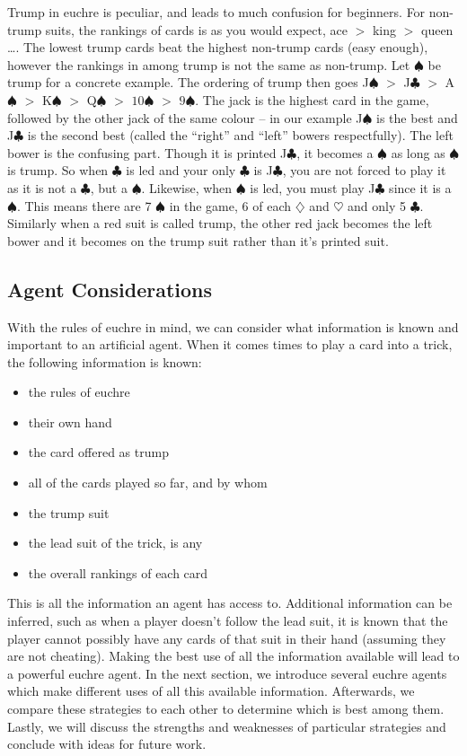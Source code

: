 Trump in euchre is peculiar, and leads to much confusion for beginners. For non-trump suits, the rankings of cards is as you would expect, ace $>$
king $>$ queen \ldots. The lowest trump cards beat the highest non-trump cards (easy enough), however the rankings in among trump is not the same as
non-trump. Let $\spadesuit$ be trump for a concrete example. The ordering of trump then goes
J$\spadesuit$ $>$ J$\clubsuit$ $>$ A$\spadesuit$ $>$ K$\spadesuit$ $>$ Q$\spadesuit$ $>$ $10\spadesuit$ $>$ $9\spadesuit$.
The jack is the highest card in the game, followed by the other jack of the same colour -- in our example J$\spadesuit$ is the best and J$\clubsuit$
is the second best (called the ``right'' and ``left'' bowers respectfully). The left bower is the confusing part. Though it is printed J$\clubsuit$, it
becomes a $\spadesuit$ as long as $\spadesuit$ is trump. So when $\clubsuit$ is led and your only $\clubsuit$ is J$\clubsuit$, you are not forced
to play it as it is not a $\clubsuit$, but a $\spadesuit$. Likewise, when $\spadesuit$ is led, you must play J$\clubsuit$ since it is a $\spadesuit$.
This means there are 7 $\spadesuit$ in the game, 6 of each $\diamondsuit$ and $\heartsuit$ and only 5 $\clubsuit$.
Similarly when a red suit is called trump, the other red jack becomes the left bower and it becomes on the trump suit rather than it's printed suit.


\subsection{Agent Considerations}

With the rules of euchre in mind, we can consider what information is known and important to an artificial agent. When it comes times to play a card
into a trick, the following information is known:
\begin{itemize}[noitemsep, label={}]
    \item the rules of euchre
    \item their own hand
    \item the card offered as trump
    \item all of the cards played so far, and by whom
    \item the trump suit
    \item the lead suit of the trick, is any
    \item the overall rankings of each card
\end{itemize}

This is all the information an agent has access to. Additional information can be inferred, such as when a player doesn't follow the lead suit,
it is known that the player cannot possibly have any cards of that suit in their hand (assuming they are not cheating). Making the best use of
all the information available will lead to a powerful euchre agent. In the next section, we introduce several euchre agents which make
different uses of all this available information. Afterwards, we compare these strategies to each other to determine which is best among them.
Lastly, we will discuss the strengths and weaknesses of particular strategies and conclude with ideas for future work.
